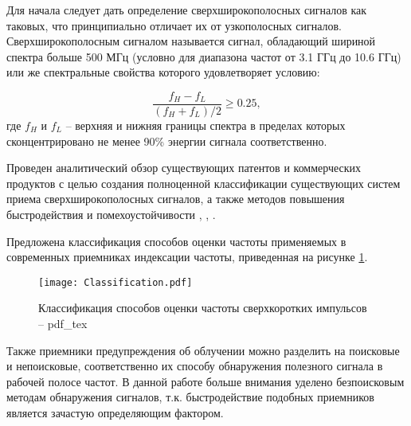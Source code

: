 Для начала следует дать определение сверхширокополосных сигналов как таковых, что принципиально отличает их от узкополосных сигналов. Сверхширокополосным сигналом называется сигнал, обладающий шириной спектра больше 500 МГц (условно для диапазона частот от 3.1 ГГц до 10.6 ГГц) или же спектральные свойства которого удовлетворяет условию:

\begin{equation*}
\frac{f_H - f_L}{(f_H + f_L)/2} \geqslant 0.25 ,
\label{eq:ubw_condition}
\end{equation*}
где \(f_H\) и \(f_L\) -- верхняя и нижняя границы спектра в пределах которых сконцентрировано не менее 90\% энергии сигнала соответственно.


Проведен аналитический обзор существующих патентов и коммерческих продуктов с целью создания полноценной классификации существующих систем приема сверхширокополосных сигналов, а также методов повышения быстродействия и помехоустойчивости \cite{jia_4-bit_2020}, \cite{cheng_introduction_2021, lin_60-ghz_nodate, gray_analysis_2009}, \cite{nagulu_ultra-wideband_2021, rahimpour_design_2019, rucker_013m_2009, pelgrom_matching_1989-1, du_112-gss_2019, hartmann_low-power_2007, saha_6-20_2012, johansen_analysis_2005, shahramian_millimeter-wave_2011, du_256-gss_2018, dyskin_wideband_2016, noauthor_photonic_nodate, noauthor_microwave_2005}.

Предложена классификация способов оценки частоты применяемых в современных приемниках индексации частоты, приведенная на рисунке \ref{ct:classification}.

\begin{figure}[ht]
	\centering
	\texttt{[image: Classification.pdf]}	
	\caption{Классификация способов оценки частоты сверхкоротких импульсов -- pdf\_tex}
	\label{ct:classification}
\end{figure}

Также приемники предупреждения об облучении можно разделить на поисковые и непоисковые, соответственно их способу обнаружения полезного сигнала в рабочей полосе частот. В данной работе больше внимания уделено безпоисковым методам обнаружения сигналов, т.к. быстродействие подобных приемников является зачастую определяющим фактором.

